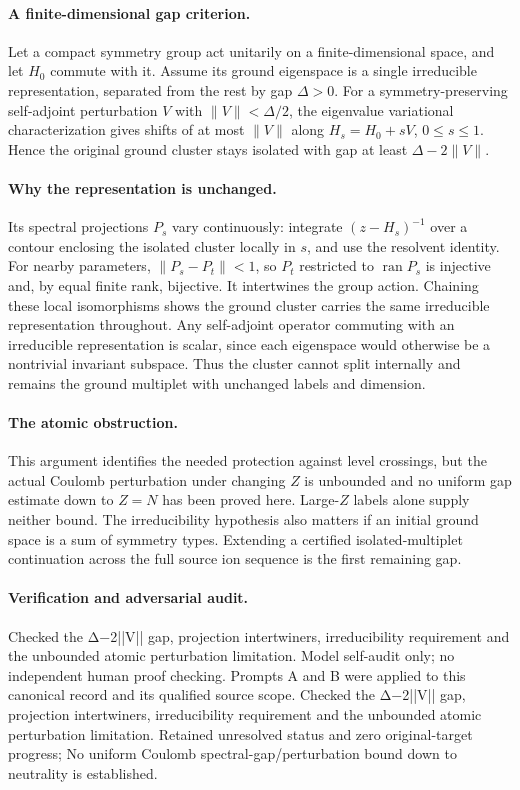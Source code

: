 \documentclass[11pt]{article}
\begin{document}
\paragraph{A finite-dimensional gap criterion.} Let a compact symmetry group act unitarily on a finite-dimensional space, and let $H_0$ commute with it. Assume its ground eigenspace is a single irreducible representation, separated from the rest by gap $\Delta>0$. For a symmetry-preserving self-adjoint perturbation $V$ with $\|V\|<\Delta/2$, the eigenvalue variational characterization gives shifts of at most $\|V\|$ along $H_s=H_0+sV$, $0\leq s\leq1$. Hence the original ground cluster stays isolated with gap at least $\Delta-2\|V\|$.

\paragraph{Why the representation is unchanged.} Its spectral projections $P_s$ vary continuously: integrate $(z-H_s)^{-1}$ over a contour enclosing the isolated cluster locally in $s$, and use the resolvent identity. For nearby parameters, $\|P_s-P_t\|<1$, so $P_t$ restricted to $\operatorname{ran}P_s$ is injective and, by equal finite rank, bijective. It intertwines the group action. Chaining these local isomorphisms shows the ground cluster carries the same irreducible representation throughout. Any self-adjoint operator commuting with an irreducible representation is scalar, since each eigenspace would otherwise be a nontrivial invariant subspace. Thus the cluster cannot split internally and remains the ground multiplet with unchanged labels and dimension.

\paragraph{The atomic obstruction.} This argument identifies the needed protection against level crossings, but the actual Coulomb perturbation under changing $Z$ is unbounded and no uniform gap estimate down to $Z=N$ has been proved here. Large-$Z$ labels alone supply neither bound. The irreducibility hypothesis also matters if an initial ground space is a sum of symmetry types. Extending a certified isolated-multiplet continuation across the full source ion sequence is the first remaining gap.

\paragraph{Verification and adversarial audit.}
Checked the Δ−2||V|| gap, projection intertwiners, irreducibility requirement and the unbounded atomic perturbation limitation. Model self-audit only; no independent human proof checking. Prompts A and B were applied to this canonical record and its qualified source scope. Checked the Δ−2||V|| gap, projection intertwiners, irreducibility requirement and the unbounded atomic perturbation limitation. Retained unresolved status and zero original-target progress; No uniform Coulomb spectral-gap/perturbation bound down to neutrality is established.
\end{document}
